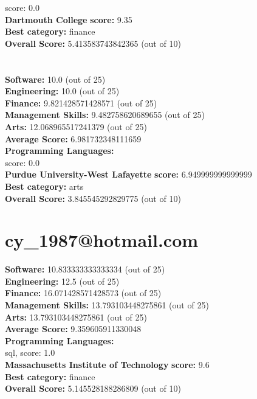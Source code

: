 \documentclass{article}
\begin{document}
score: 0.0\\
\textbf{Dartmouth College} \textbf{score:} 9.35\\
\textbf{Best category: } finance\\
\textbf{Overall Score: }5.413583743842365 (out of 10)\section{}
\textbf{Software:} 10.0 (out of 25)\\
\textbf{Engineering: } 10.0 (out of 25)\\
\textbf{Finance:} 9.821428571428571 (out of 25)\\
\textbf{Management Skills:} 9.482758620689655 (out of 25)\\
\textbf{Arts:} 12.068965517241379 (out of 25)\\
\textbf{Average Score: } 6.981732348111659\\
\textbf{Programming Languages:} \\
score: 0.0\\
\textbf{Purdue University-West Lafayette} \textbf{score:} 6.949999999999999\\
\textbf{Best category: } arts\\
\textbf{Overall Score: }3.845545292829775 (out of 10)\section{cy_1987@hotmail.com}
\textbf{Software:} 10.833333333333334 (out of 25)\\
\textbf{Engineering: } 12.5 (out of 25)\\
\textbf{Finance:} 16.071428571428573 (out of 25)\\
\textbf{Management Skills:} 13.793103448275861 (out of 25)\\
\textbf{Arts:} 13.793103448275861 (out of 25)\\
\textbf{Average Score: } 9.359605911330048\\
\textbf{Programming Languages:} \\
sql, score: 1.0\\
\textbf{Massachusetts Institute of Technology} \textbf{score:} 9.6\\
\textbf{Best category: } finance\\
\textbf{Overall Score: }5.145528188286809 (out of 10)\section{}
\end{document}
